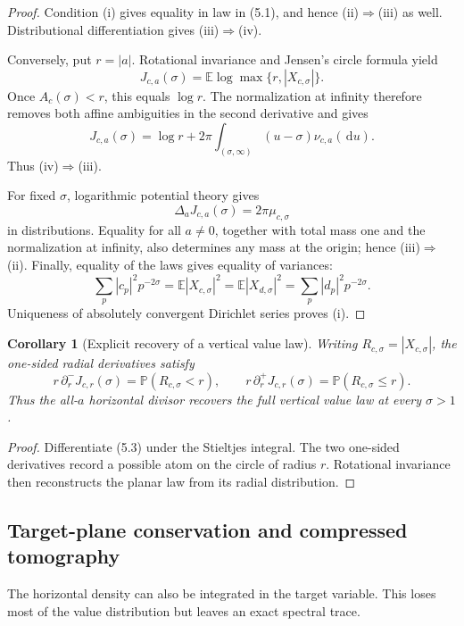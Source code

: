 \documentclass[11pt]{article}
\newtheorem{corollary}[theorem]{Corollary}
\theoremstyle{definition}
\theoremstyle{remark}
\newcommand{\dd}{\,\mathrm d}
\begin{document}
\begin{proof}
Condition (i) gives equality in law in (5.1), and hence (ii)$\Rightarrow$(iii)
as well.  Distributional differentiation gives (iii)$\Rightarrow$(iv).

Conversely, put $r=|a|$.  Rotational invariance and Jensen's circle formula yield
\[
 J_{c,a}(\sigma)=
 \mathbb E\log\max\{r,|X_{c,\sigma}|\}.
\tag{5.3}
\]
Once $A_c(\sigma)<r$, this equals $\log r$.  The normalization at infinity therefore
removes both affine ambiguities in the second derivative and gives
\[
 \boxed{
 J_{c,a}(\sigma)=\log r+
 2\pi\int_{(\sigma,\infty)}(u-\sigma)\nu_{c,a}(\dd u).
 }
\tag{5.4}
\]
Thus (iv)$\Rightarrow$(iii).

For fixed $\sigma$, logarithmic potential theory gives
\[
 \Delta_aJ_{c,a}(\sigma)=2\pi\mu_{c,\sigma}
\tag{5.5}
\]
in distributions.  Equality for all $a\ne0$, together with total mass one and the
normalization at infinity, also determines any mass at the origin; hence
(iii)$\Rightarrow$(ii).  Finally, equality of the laws gives equality of variances:
\[
 \sum_p|c_p|^2p^{-2\sigma}
 =\mathbb E|X_{c,\sigma}|^2
 =\mathbb E|X_{d,\sigma}|^2
 =\sum_p|d_p|^2p^{-2\sigma}.
\tag{5.6}
\]
Uniqueness of absolutely convergent Dirichlet series proves (i).
\end{proof}

\begin{corollary}[Explicit recovery of a vertical value law]
\label{cor:radial-recovery}
Writing $R_{c,\sigma}=|X_{c,\sigma}|$, the one-sided radial derivatives satisfy
\[
 r\,\partial_r^-J_{c,r}(\sigma)=\mathbb P(R_{c,\sigma}<r),
 \qquad
 r\,\partial_r^+J_{c,r}(\sigma)=\mathbb P(R_{c,\sigma}\le r).
\tag{5.7}
\]
Thus the all-$a$ horizontal divisor recovers the full vertical value law at every
$\sigma>1$.
\end{corollary}

\begin{proof}
Differentiate (5.3) under the Stieltjes integral.  The two one-sided derivatives record
a possible atom on the circle of radius $r$.  Rotational invariance then reconstructs
the planar law from its radial distribution.
\end{proof}

\subsection{Target-plane conservation and compressed tomography}

The horizontal density can also be integrated in the target variable.  This loses most
of the value distribution but leaves an exact spectral trace.
\end{document}
